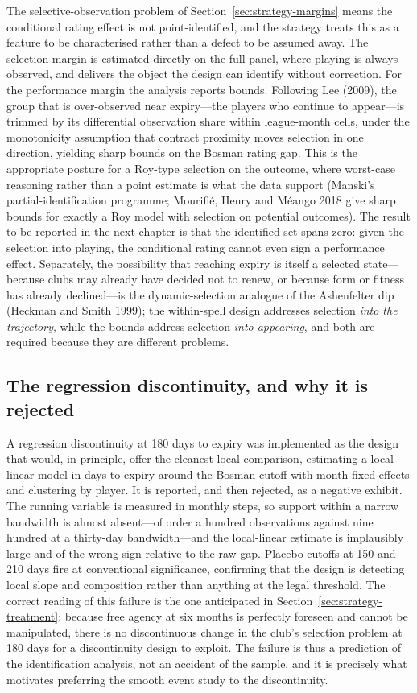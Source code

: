 The selective-observation problem of Section~\ref{sec:strategy-margins} means the
conditional rating effect is not point-identified, and the strategy treats this as
a feature to be characterised rather than a defect to be assumed away. The
selection margin is estimated directly on the full panel, where playing is always
observed, and delivers the object the design can identify without correction. For
the performance margin the analysis reports bounds. Following Lee (2009), the
group that is over-observed near expiry---the players who continue to appear---is
trimmed by its differential observation share within league-month cells, under the
monotonicity assumption that contract proximity moves selection in one direction,
yielding sharp bounds on the Bosman rating gap. This is the appropriate posture for
a Roy-type selection on the outcome, where worst-case reasoning rather than a
point estimate is what the data support (Manski's partial-identification
programme; Mourifi\'e, Henry and M\'eango 2018 give sharp bounds for exactly a Roy
model with selection on potential outcomes). The result to be reported in the next
chapter is that the identified set spans zero: given the selection into playing, the
conditional rating cannot even sign a performance effect. Separately, the
possibility that reaching expiry is itself a selected state---because clubs may
already have decided not to renew, or because form or fitness has already
declined---is the dynamic-selection analogue of the Ashenfelter dip (Heckman and
Smith 1999); the within-spell design addresses selection \emph{into the
trajectory}, while the bounds address selection \emph{into appearing}, and both are
required because they are different problems.

\subsection{The regression discontinuity, and why it is rejected}
\label{sec:strategy-rdd}

A regression discontinuity at 180 days to expiry was implemented as the design that
would, in principle, offer the cleanest local comparison, estimating a local linear
model in days-to-expiry around the Bosman cutoff with month fixed effects and
clustering by player. It is reported, and then rejected, as a negative exhibit. The
running variable is measured in monthly steps, so support within a narrow bandwidth
is almost absent---of order a hundred observations against nine hundred at a
thirty-day bandwidth---and the local-linear estimate is implausibly large and of
the wrong sign relative to the raw gap. Placebo cutoffs at 150 and 210 days fire at
conventional significance, confirming that the design is detecting local slope and
composition rather than anything at the legal threshold. The correct reading of this
failure is the one anticipated in Section~\ref{sec:strategy-treatment}: because free
agency at six months is perfectly foreseen and cannot be manipulated, there is no
discontinuous change in the club's selection problem at 180 days for a discontinuity
design to exploit. The failure is thus a prediction of the identification analysis,
not an accident of the sample, and it is precisely what motivates preferring the
smooth event study to the discontinuity.

